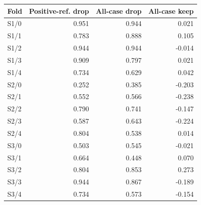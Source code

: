 \begin{tabular}{lrrr}
\toprule
Fold & Positive-ref. drop & All-case drop & All-case keep \\
\midrule
S1/0 & 0.951 & 0.944 & 0.021 \\
S1/1 & 0.783 & 0.888 & 0.105 \\
S1/2 & 0.944 & 0.944 & -0.014 \\
S1/3 & 0.909 & 0.797 & 0.021 \\
S1/4 & 0.734 & 0.629 & 0.042 \\
S2/0 & 0.252 & 0.385 & -0.203 \\
S2/1 & 0.552 & 0.566 & -0.238 \\
S2/2 & 0.790 & 0.741 & -0.147 \\
S2/3 & 0.587 & 0.643 & -0.224 \\
S2/4 & 0.804 & 0.538 & 0.014 \\
S3/0 & 0.503 & 0.545 & -0.021 \\
S3/1 & 0.664 & 0.448 & 0.070 \\
S3/2 & 0.804 & 0.853 & 0.273 \\
S3/3 & 0.944 & 0.867 & -0.189 \\
S3/4 & 0.734 & 0.573 & -0.154 \\
\bottomrule
\end{tabular}
